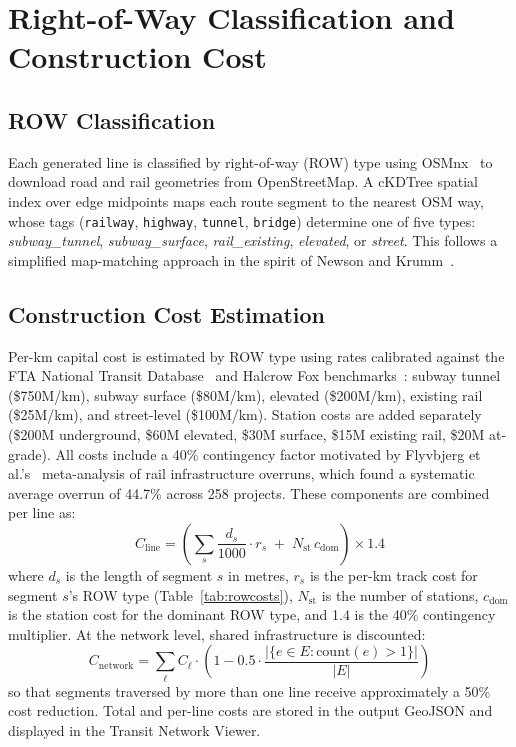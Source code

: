 \documentclass[sigconf,nonacm]{acmart}
\begin{document}
\section{Right-of-Way Classification and Construction Cost}

\subsection{ROW Classification}

Each generated line is classified by right-of-way (ROW) type using OSMnx~\cite{boeing2017osmnx} to download road and rail geometries from OpenStreetMap. A cKDTree spatial index over edge midpoints maps each route segment to the nearest OSM way, whose tags (\texttt{railway}, \texttt{highway}, \texttt{tunnel}, \texttt{bridge}) determine one of five types: \textit{subway\_tunnel}, \textit{subway\_surface}, \textit{rail\_existing}, \textit{elevated}, or \textit{street}. This follows a simplified map-matching approach in the spirit of Newson and Krumm~\cite{newson2009mapmatching}.

\subsection{Construction Cost Estimation}

Per-km capital cost is estimated by ROW type using rates calibrated against the FTA National Transit Database~\cite{fta2023ntd} and Halcrow Fox benchmarks~\cite{halcrow2000cost}: subway tunnel (\$750M/km), subway surface (\$80M/km), elevated (\$200M/km), existing rail (\$25M/km), and street-level (\$100M/km). Station costs are added separately (\$200M underground, \$60M elevated, \$30M surface, \$15M existing rail, \$20M at-grade). All costs include a 40\% contingency factor motivated by Flyvbjerg et al.'s~\cite{flyvbjerg2003overruns} meta-analysis of rail infrastructure overruns, which found a systematic average overrun of 44.7\% across 258 projects. These components are combined per line as:
\[
  C_{\mathrm{line}} = \left(\sum_{s}\frac{d_s}{1000}\cdot r_s \;+\; N_{\mathrm{st}}\,c_{\mathrm{dom}}\right)\times 1.4
\]
where $d_s$ is the length of segment $s$ in metres, $r_s$ is the per-km track cost for segment $s$'s ROW type (Table~\ref{tab:rowcosts}), $N_{\mathrm{st}}$ is the number of stations, $c_{\mathrm{dom}}$ is the station cost for the dominant ROW type, and 1.4 is the 40\% contingency multiplier. At the network level, shared infrastructure is discounted:
\[
  C_{\mathrm{network}} = \sum_{\ell} C_\ell \cdot \left(1 - 0.5\cdot\frac{|\{e \in E : \mathrm{count}(e) > 1\}|}{|E|}\right)
\]
so that segments traversed by more than one line receive approximately a 50\% cost reduction. Total and per-line costs are stored in the output GeoJSON and displayed in the Transit Network Viewer.
\end{document}
